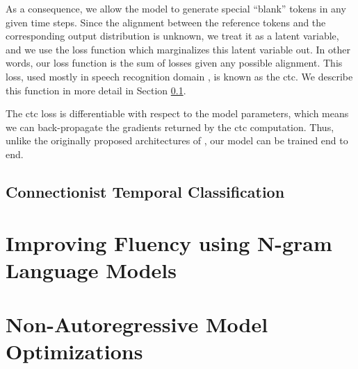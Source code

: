 As a consequence, we allow the model to generate special ``blank'' tokens in
any given time steps. Since the alignment between the reference tokens and the
corresponding output distribution is unknown, we treat it as a latent variable,
and we use the loss function which marginalizes this latent variable out. In
other words, our loss function is the sum of losses given any possible
alignment. This loss, used mostly in speech recognition domain
\citep{graves2006connectionist}, is known as the \acrfull{ctc}. We describe
this function in more detail in Section \ref{subsec:ctc}.

The \gls{ctc} loss is differentiable with respect to the model parameters,
which means we can back-propagate the gradients returned by the \gls{ctc}
computation. Thus, unlike the originally proposed architectures of
\citet{gu2017nonautoregressive}, our model can be trained end to end.


\subsection{Connectionist Temporal Classification}
\label{subsec:ctc}






\section{Improving Fluency using N-gram Language Models}
\label{sec:nat-lm}





\section{Non-Autoregressive Model Optimizations}
\label{sec:nat-opt}




